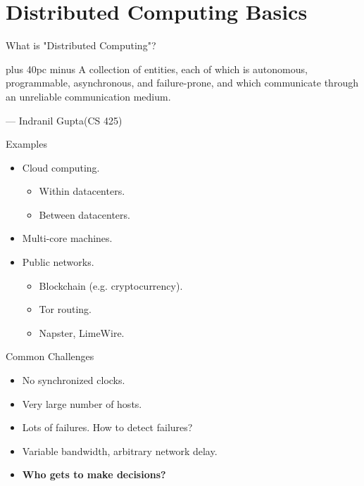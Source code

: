\documentclass[aspectratio=169]{beamer}
\newcommand\quoteAuthorDate[3]{\begingroup
  \baselineskip 10pt
  \parfillskip 0pt
  \interlinepenalty 10000 %
  \leftskip 0pt plus 40pc minus \parindent
  \let\rm=\eightss
  \let\sl=\eightssi
  \everypar{\sl}#1\par
  \nobreak\smallskip
  \noindent\rm--- #2\unskip\enspace(#3)\par
  \endgroup}
\begin{document}
\section{Distributed Computing Basics}
\frame{\sectionpage}


\begin{frame}{What is "Distributed Computing"?}
\begin{center}
     \item \quoteAuthorDate{A collection of entities, each of which is autonomous, programmable, asynchronous, and failure-prone, and which communicate through an unreliable communication medium.}{Indranil Gupta}{\textcolor{sigma@mainblue}{CS 425}}
\end{center}
\end{frame}



\begin{frame}{Examples}
\begin{itemize}
    \item Cloud computing.
    \begin{itemize}
        \item Within datacenters.
        \item Between datacenters.
    \end{itemize}\pause
    \item Multi-core machines.\pause
    \item Public networks.
    \begin{itemize}
        \item Blockchain (e.g. cryptocurrency).
        \item Tor routing.
        \item Napster, LimeWire.
    \end{itemize}
\end{itemize}
\end{frame}


\begin{frame}{Common Challenges}
    \begin{itemize}
        \item No synchronized clocks.
        \item Very large number of hosts.
        \item Lots of failures. How to detect failures?
        \item Variable bandwidth, arbitrary network delay.\pause
        \item \textbf{Who gets to make decisions?}
    \end{itemize}
\end{frame}
\end{document}
